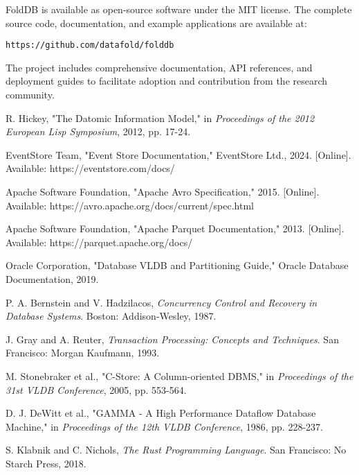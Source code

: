 \documentclass[11pt,a4paper]{article}
\begin{document}
FoldDB is available as open-source software under the MIT license. The complete source code, documentation, and example applications are available at:

\texttt{https://github.com/datafold/folddb}

The project includes comprehensive documentation, API references, and deployment guides to facilitate adoption and contribution from the research community.

\begin{thebibliography}{00}
 R. Hickey, "The Datomic Information Model," in \textit{Proceedings of the 2012 European Lisp Symposium}, 2012, pp. 17-24.

 EventStore Team, "Event Store Documentation," EventStore Ltd., 2024. [Online]. Available: https://eventstore.com/docs/

 Apache Software Foundation, "Apache Avro Specification," 2015. [Online]. Available: https://avro.apache.org/docs/current/spec.html

 Apache Software Foundation, "Apache Parquet Documentation," 2013. [Online]. Available: https://parquet.apache.org/docs/

 Oracle Corporation, "Database VLDB and Partitioning Guide," Oracle Database Documentation, 2019.

 P. A. Bernstein and V. Hadzilacos, \textit{Concurrency Control and Recovery in Database Systems}. Boston: Addison-Wesley, 1987.

 J. Gray and A. Reuter, \textit{Transaction Processing: Concepts and Techniques}. San Francisco: Morgan Kaufmann, 1993.

 M. Stonebraker et al., "C-Store: A Column-oriented DBMS," in \textit{Proceedings of the 31st VLDB Conference}, 2005, pp. 553-564.

 D. J. DeWitt et al., "GAMMA - A High Performance Dataflow Database Machine," in \textit{Proceedings of the 12th VLDB Conference}, 1986, pp. 228-237.

 S. Klabnik and C. Nichols, \textit{The Rust Programming Language}. San Francisco: No Starch Press, 2018.

\end{thebibliography}
\end{document}
